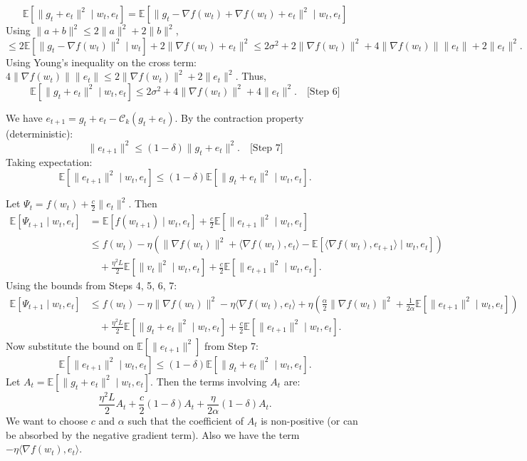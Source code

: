 \documentclass{article}
\begin{document}
\[
\mathbb{E}[\|g_t + e_t\|^2 \mid w_t, e_t] = \mathbb{E}[\|g_t - \nabla f(w_t) + \nabla f(w_t) + e_t\|^2 \mid w_t, e_t]
\]
Using $\|a+b\|^2 \le 2\|a\|^2 + 2\|b\|^2$,
\[
\le 2 \mathbb{E}[\|g_t - \nabla f(w_t)\|^2 \mid w_t] + 2 \|\nabla f(w_t) + e_t\|^2
\le 2\sigma^2 + 2\|\nabla f(w_t)\|^2 + 4\|\nabla f(w_t)\|\|e_t\| + 2\|e_t\|^2.
\]
Using Young's inequality on the cross term: $4\|\nabla f(w_t)\|\|e_t\| \le 2\|\nabla f(w_t)\|^2 + 2\|e_t\|^2$.
Thus,
\[
\mathbb{E}[\|g_t + e_t\|^2 \mid w_t, e_t] \le 2\sigma^2 + 4\|\nabla f(w_t)\|^2 + 4\|e_t\|^2. \quad \text{[Step 6]}
\]

We have $e_{t+1} = g_t + e_t - \mathcal{C}_k(g_t + e_t)$.
By the contraction property (deterministic):
\[
\|e_{t+1}\|^2 \le (1-\delta) \|g_t + e_t\|^2. \quad \text{[Step 7]}
\]
Taking expectation:
\[
\mathbb{E}[\|e_{t+1}\|^2 \mid w_t, e_t] \le (1-\delta) \mathbb{E}[\|g_t + e_t\|^2 \mid w_t, e_t].
\]

Let $\Psi_t = f(w_t) + \frac{c}{2} \|e_t\|^2$. Then
\begin{align*}
\mathbb{E}[\Psi_{t+1} \mid w_t, e_t] 
&= \mathbb{E}[f(w_{t+1}) \mid w_t, e_t] + \frac{c}{2} \mathbb{E}[\|e_{t+1}\|^2 \mid w_t, e_t] \\
&\le f(w_t) - \eta \left( \|\nabla f(w_t)\|^2 + \langle \nabla f(w_t), e_t \rangle - \mathbb{E}[\langle \nabla f(w_t), e_{t+1} \rangle \mid w_t, e_t] \right) \\
&\quad + \frac{\eta^2 L}{2} \mathbb{E}[\|v_t\|^2 \mid w_t, e_t] + \frac{c}{2} \mathbb{E}[\|e_{t+1}\|^2 \mid w_t, e_t].
\end{align*}
Using the bounds from Steps 4, 5, 6, 7:
\begin{align*}
\mathbb{E}[\Psi_{t+1} \mid w_t, e_t] 
&\le f(w_t) - \eta \|\nabla f(w_t)\|^2 - \eta \langle \nabla f(w_t), e_t \rangle + \eta \left( \frac{\alpha}{2} \|\nabla f(w_t)\|^2 + \frac{1}{2\alpha} \mathbb{E}[\|e_{t+1}\|^2 \mid w_t, e_t] \right) \\
&\quad + \frac{\eta^2 L}{2} \mathbb{E}[\|g_t + e_t\|^2 \mid w_t, e_t] + \frac{c}{2} \mathbb{E}[\|e_{t+1}\|^2 \mid w_t, e_t].
\end{align*}
Now substitute the bound on $\mathbb{E}[\|e_{t+1}\|^2]$ from Step 7:
\[
\mathbb{E}[\|e_{t+1}\|^2 \mid w_t, e_t] \le (1-\delta) \mathbb{E}[\|g_t + e_t\|^2 \mid w_t, e_t].
\]
Let $A_t = \mathbb{E}[\|g_t + e_t\|^2 \mid w_t, e_t]$. Then the terms involving $A_t$ are:
\[
\frac{\eta^2 L}{2} A_t + \frac{c}{2} (1-\delta) A_t + \frac{\eta}{2\alpha} (1-\delta) A_t.
\]
We want to choose $c$ and $\alpha$ such that the coefficient of $A_t$ is non-positive (or can be absorbed by the negative gradient term). Also we have the term $-\eta \langle \nabla f(w_t), e_t \rangle$.
\end{document}
